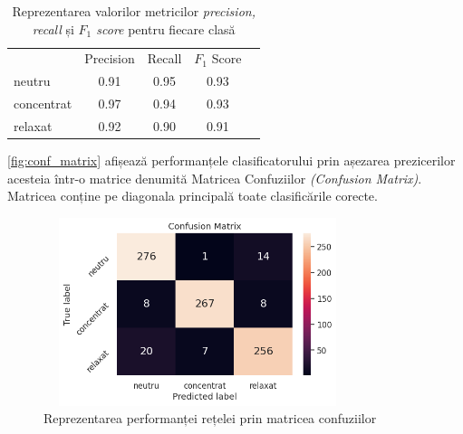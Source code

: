 \begin{table}[ht]
\centering
\caption{Reprezentarea valorilor metricilor \textit{precision, recall} și \textit{$F_1$ score} pentru fiecare clasă}
\label{tabel:classification-report}
\renewcommand{\arraystretch}{1.2}
\begin{tabular}{@{}lcccc@{}}
\cmidrule[\heavyrulewidth]{2-4}
 & Precision & Recall & $F_1$ Score \\ \cmidrule{2-4}
neutru & 0.91 & 0.95 & 0.93 \\
concentrat & 0.97 & 0.94 & 0.93 \\
relaxat & 0.92 & 0.90 & 0.91 \\ \bottomrule
\end{tabular}
\end{table}

\autoref{fig:conf_matrix} afișează performanțele clasificatorului prin așezarea prezicerilor acesteia într-o matrice denumită Matricea Confuziilor \textit{(Confusion Matrix)}. Matricea conține pe diagonala principală toate clasificările corecte.

\begin{figure}[H]
\centering
\includegraphics[width=9cm, height=5.5cm]{fig/cap3/conf_matrix.png}
\caption{Reprezentarea performanței rețelei prin matricea confuziilor}\label{fig:conf_matrix}
\end{figure}

